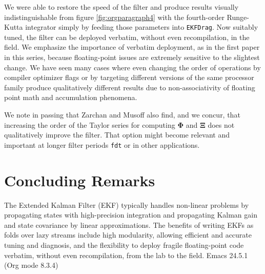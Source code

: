\documentclass[10pt,oneside,x11names]{article}
\begin{document}
We were able to restore the speed of the filter and produce results visually
indistinguishable from figure \ref{fig:orgparagraph4} with the
fourth-order Runge-Kutta integrator simply by feeding those parameters into
\texttt{EKFDrag}. Now suitably tuned, the filter can be deployed verbatim, without even
recompilation, in the field. We emphasize the importance of verbatim deployment,
as in the first paper in this series, because floating-point issues are
extremely sensitive to the slightest change. We have seen many cases where even
changing the order of operations by compiler optimizer flags or by targeting
different versions of the same processor family produce qualitatively different
results due to non-associativity of floating point math and accumulation
phenomena. 

We note in passing that Zarchan and Musoff also find, and we concur, that
increasing the order of the Taylor series for computing \(\mathbold{\Phi}\) and
\(\mathbold{\Xi}\) does not qualitatively improve the filter. That option might
become relevant and important at longer filter periods \texttt{fdt} or in other
applications.

\section{Concluding Remarks}
\label{sec:orgheadline12}

The Extended Kalman Filter (EKF) typically handles non-linear problems by propagating
states with high-precision integration and propagating 
Kalman gain and state covariance by linear approximations. The benefits of
writing EKFs as folds over lazy streams include high modularity, allowing
efficient and accurate tuning and diagnosis, and the flexibility to deploy
fragile floating-point code verbatim, without even recompilation, from the lab
to the field.
Emacs 24.5.1 (Org mode 8.3.4)
\end{document}
